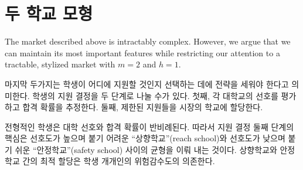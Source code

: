 \documentclass[12pt]{article} %
\newif\ifEN
\theoremstyle{definition}
\theoremstyle{definition}
\begin{document}
\ifEN \section{Two-school model} \else \section{두 학교 모형} \fi
The market described above is intractably complex. However, we argue that we can maintain its most important features while restricting our attention to a tractable, stylized market with $m=2$ and $h=1$. 

\ifEN{
The coexistence of an application limit and uncertainty in college preferences requires students to strategize in selecting the set of schools to which they apply. We can think of the student’s application decision of consisting of two parts: First, she must rank the colleges by preferability and identify her admissions probability at each. Second, she must allocate her limited applications across the set of schools in the market.

For a typical student, college preferability and admissions probability are negatively correlated. Thus, the second stage of the application decision boils down to trading off schools that are desirable but hard to get into (reach schools) with schools that are less desirable but easy to get into (safety schools). The optimal allocation between reach schools and safety schools depends on the individual student’s tolerance for risk.
} \else{
마지막 두가지는 학생이 어디에 지원할 것인지 선택하는 데에 전략을 세워야 한다고 의미한다. 학생의 지원 결정을 두 단계로 나눌 수가 있다. 첫째, 각 대학교의 선호를 평가하고 합격 확률을 추정한다. 둘째, 제한된 지원들을 시장의 학교에 할당한다.

전형적인 학생은 대학 선호와 합격 확률이 반비례된다. 따라서 지원 결정 둘째 단계의 핵심은 선호도가 높으며 붙기 어려운 “상향학교”(reach school)와 선호도가 낮으며 붙기 쉬운 “안정학교”(safety school) 사이의 균형을 이뤄 내는 것이다. 상향학교와 안정학교 간의 최적 할당은 학생 개개인의 위험감수도의 의존한다.
}\fi
\end{document}
